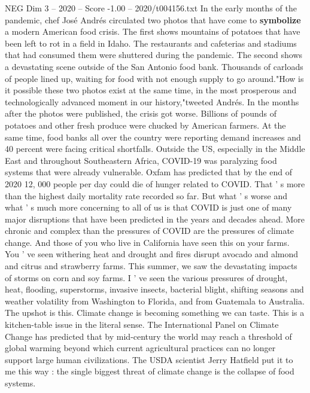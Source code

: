 \begin{textsample}{NEG Dim 3 – 2020 – Score -1.00 – 2020/t004156.txt}  \label{ex:f3_neg_068}
In the early months of the pandemic, chef José Andrés circulated two photos that have come to \textbf{symbolize} a modern American food crisis.
The first shows mountains of potatoes that have been left to rot in a field in Idaho.
The restaurants and cafeterias and stadiums that had consumed them were shuttered during the pandemic.
The second shows a devastating scene outside of the San Antonio food bank.
Thousands of carloads of people lined up, waiting for food with not enough supply to go around."How is it possible these two photos exist at the same time, in the most prosperous and technologically advanced moment in our history,"tweeted Andrés.
In the months after the photos were published, the crisis got worse.
Billions of pounds of potatoes and other fresh produce were chucked by American farmers.
At the same time, food banks all over the country were reporting demand increases and 40 percent were facing critical shortfalls.
Outside the US, especially in the Middle East and throughout Southeastern Africa, COVID-19 was paralyzing food systems that were already vulnerable.
Oxfam has predicted that by the end of 2020 12, 000 people per day could die of hunger related to COVID.
That ' s more than the highest daily mortality rate recorded so far.
But what ' s worse and what ' s much more concerning to all of us is that COVID is just one of many major disruptions that have been predicted in the years and decades ahead.
More chronic and complex than the pressures of COVID are the pressures of climate change.
And those of you who live in California have seen this on your farms.
You ' ve seen withering heat and drought and fires disrupt avocado and almond and citrus and strawberry farms.
This summer, we saw the devastating impacts of storms on corn and soy farms.
I ' ve seen the various pressures of drought, heat, flooding, superstorms, invasive insects, bacterial blight, shifting seasons and weather volatility from Washington to Florida, and from Guatemala to Australia.
The upshot is this.
Climate change is becoming something we can taste.
This is a kitchen-table issue in the literal sense.
The International Panel on Climate Change has predicted that by mid-century the world may reach a threshold of global warming beyond which current agricultural practices can no longer support large human civilizations.
The USDA scientist Jerry Hatfield put it to me this way : the single biggest threat of climate change is the collapse of food systems.

\end{textsample}
